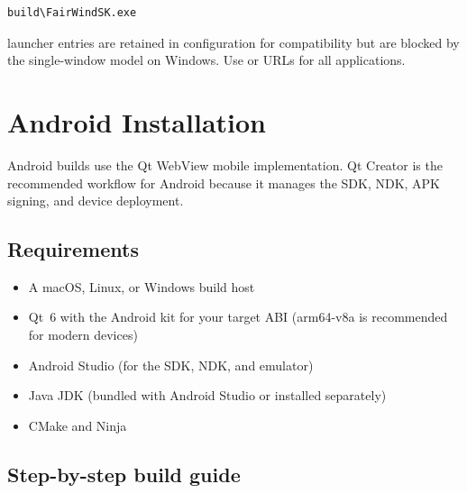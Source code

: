 \begin{lstlisting}
build\FairWindSK.exe
\end{lstlisting}

\begin{notebox}
 launcher entries are retained in configuration for
compatibility but are blocked by the single-window model on Windows.
Use  or  URLs for all applications.
\end{notebox}

\section{Android Installation}
\label{app:android}

Android builds use the Qt WebView mobile implementation.
Qt Creator is the recommended workflow for Android because it manages
the SDK, NDK, APK signing, and device deployment.

\subsection{Requirements}

\begin{itemize}
  \item A macOS, Linux, or Windows build host
  \item Qt~6 with the Android kit for your target ABI
        (arm64-v8a is recommended for modern devices)
  \item Android Studio (for the SDK, NDK, and emulator)
  \item Java JDK (bundled with Android Studio or installed separately)
  \item CMake and Ninja
\end{itemize}

\subsection{Step-by-step build guide}

